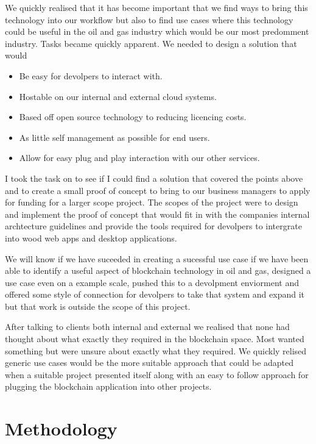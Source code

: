 \documentclass[runningheads]{llncs}
\begin{document}
We quickly realised that it has become important that we find ways to bring this technology into our workflow but also to find use cases where this technology could be useful in the oil and gas industry which would be our most predomment industry.
Tasks became quickly apparent. We needed to design a solution that would
\begin{itemize}
	\item Be easy for devolpers to interact with.
	\item Hostable on our internal and external cloud systems.
	\item Based off open source technology to reducing licencing costs.
	\item As little self management as possible for end users.
	\item Allow for easy plug and play interaction with our other services.
\end{itemize}

I took the task on to see if I could find a solution that covered the points above and to create a small proof of concept to bring to our business managers to apply for funding for a larger scope project. The scopes of the project were to design and implement the proof of concept that would fit in with the companies internal archtecture guidelines and provide the tools required for devolpers to intergrate into wood web apps and desktop applications.

We will know if we have suceeded in creating a sucessful use case if we have been able to identify a useful aspect of blockchain technology in oil and gas, designed a use case even on a example scale, pushed this to a devolpment enviorment and offered some style of connection for devolpers to take that system and expand it but that work is outside the scope of this project.

After talking to clients both internal and external we realised that none had thought about what exactly they required in the blockchain space. Most wanted something but were unsure about exactly what they required. We quickly relised generic use cases would be the more suitable approach that could be adapted when a suitable project presented itself along with an easy to follow approach for plugging the blockchain application into other projects.


\section{Methodology}
\end{document}
